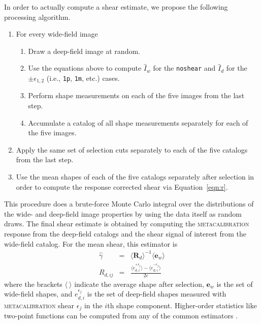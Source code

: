 \documentclass[twocolumn]{openjournal}
\makeatletter
\newcommand{\mcal}{\textsc{metacalibration}\@\xspace}
\newcommand{\noshear}{\texttt{noshear}\@\xspace}
\makeatother
\begin{document}
In order to actually compute a shear estimate, we propose the following processing
algorithm.
\begin{enumerate}
\item For every wide-field image
\begin{enumerate}
  \item Draw a deep-field image at random.
  \item Use the equations above to compute $\hat I_{w}$ for the \noshear
    and $\hat I_{d}$ for the $\pm\epsilon_{1,2}$ (i.e., \texttt{1p}, \texttt{1m}, etc.)
    cases.
  \item Perform shape measurements on each of the five images from the last step.
  \item Accumulate a catalog of all shape measurements separately for each of the
    five images.
\end{enumerate}
\item Apply the same set of selection cuts separately to each of the five catalogs from
  the last step.
\item Use the mean shapes of each of the five catalogs separately after selection in
  order to compute the response corrected shear via Equation~\ref{eqn:r}.
\end{enumerate}
This procedure does a brute-force Monte Carlo integral over the
distributions of the wide- and deep-field image properties by using the data itself as
random draws. The final shear estimate is obtained by computing the \mcal response from the deep-field
catalogs and the shear signal of interest from the wide-field catalog. For the mean
shear, this estimator is
\begin{eqnarray}\label{eqn:r}
\hat\gamma & = & \langle\mathbf{R}_d\rangle^{-1} \langle\mathbf{e}_{w}\rangle\\
R_{d,ij} & = & \frac{\langle e^{+\epsilon_j}_{d,i}\rangle - \langle e^{-\epsilon_j}_{d,i}\rangle}{2\epsilon}\nonumber
\end{eqnarray}
where the brackets $\langle\ \rangle$ indicate the average shape after selection,
$\mathbf{e}_{w}$ is the set of wide-field shapes, and $e^{\epsilon_j}_{d,i}$ is the set
of deep-field shapes measured  with \mcal shear $\epsilon_j$ in the $i$th shape
component. Higher-order statistics like two-point functions can be computed from
any of the common estimators \citep[see, e.g.,][for examples]{desy3shear}.
\end{document}
